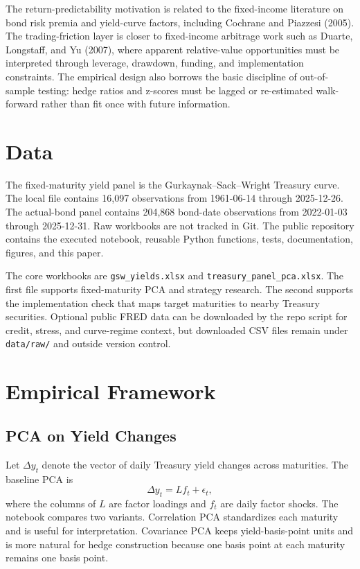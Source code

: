 \documentclass[12pt]{article}
\begin{document}
The return-predictability motivation is related to the fixed-income literature on bond risk premia
and yield-curve factors, including Cochrane and Piazzesi (2005). The trading-friction layer is
closer to fixed-income arbitrage work such as Duarte, Longstaff, and Yu (2007), where apparent
relative-value opportunities must be interpreted through leverage, drawdown, funding, and
implementation constraints. The empirical design also borrows the basic discipline of
out-of-sample testing: hedge ratios and z-scores must be lagged or re-estimated walk-forward
rather than fit once with future information.

\section{Data}

The fixed-maturity yield panel is the Gurkaynak--Sack--Wright Treasury curve. The local file
contains 16,097 observations from 1961-06-14 through 2025-12-26. The actual-bond panel contains
204,868 bond-date observations from 2022-01-03 through 2025-12-31. Raw workbooks are not
tracked in Git. The public repository contains the executed notebook, reusable Python functions,
tests, documentation, figures, and this paper.

The core workbooks are \texttt{gsw\_yields.xlsx} and \texttt{treasury\_panel\_pca.xlsx}. The first
file supports fixed-maturity PCA and strategy research. The second supports the implementation
check that maps target maturities to nearby Treasury securities. Optional public FRED data can
be downloaded by the repo script for credit, stress, and curve-regime context, but downloaded
CSV files remain under \texttt{data/raw/} and outside version control.

\section{Empirical Framework}

\subsection{PCA on Yield Changes}

Let $\Delta y_t$ denote the vector of daily Treasury yield changes across maturities. The baseline
PCA is
\begin{equation}
    \Delta y_t = L f_t + \epsilon_t,
\end{equation}
where the columns of $L$ are factor loadings and $f_t$ are daily factor shocks. The notebook
compares two variants. Correlation PCA standardizes each maturity and is useful for interpretation.
Covariance PCA keeps yield-basis-point units and is more natural for hedge construction because
one basis point at each maturity remains one basis point.
\end{document}
